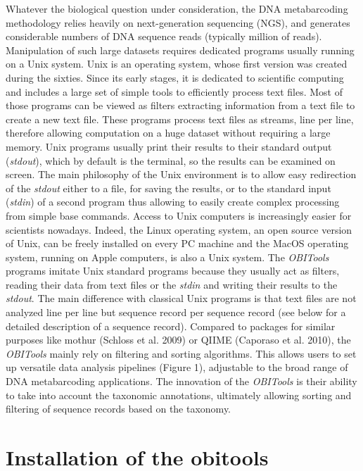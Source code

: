 \documentclass[
  letterpaper,
  DIV=11,
  numbers=noendperiod]{scrreprt}
\begin{document}
Whatever the biological question under consideration, the DNA
metabarcoding methodology relies heavily on next-generation sequencing
(NGS), and generates considerable numbers of DNA sequence reads
(typically million of reads). Manipulation of such large datasets
requires dedicated programs usually running on a Unix system. Unix is an
operating system, whose first version was created during the sixties.
Since its early stages, it is dedicated to scientific computing and
includes a large set of simple tools to efficiently process text files.
Most of those programs can be viewed as filters extracting information
from a text file to create a new text file. These programs process text
files as streams, line per line, therefore allowing computation on a
huge dataset without requiring a large memory. Unix programs usually
print their results to their standard output (\emph{stdout}), which by
default is the terminal, so the results can be examined on screen. The
main philosophy of the Unix environment is to allow easy redirection of
the \emph{stdout} either to a file, for saving the results, or to the
standard input (\emph{stdin}) of a second program thus allowing to
easily create complex processing from simple base commands. Access to
Unix computers is increasingly easier for scientists nowadays. Indeed,
the Linux operating system, an open source version of Unix, can be
freely installed on every PC machine and the MacOS operating system,
running on Apple computers, is also a Unix system. The \emph{OBITools}
programs imitate Unix standard programs because they usually act as
filters, reading their data from text files or the \emph{stdin} and
writing their results to the \emph{stdout}. The main difference with
classical Unix programs is that text files are not analyzed line per
line but sequence record per sequence record (see below for a detailed
description of a sequence record). Compared to packages for similar
purposes like mothur (Schloss et al. 2009) or QIIME (Caporaso et al.
2010), the \emph{OBITools} mainly rely on filtering and sorting
algorithms. This allows users to set up versatile data analysis
pipelines (Figure 1), adjustable to the broad range of DNA metabarcoding
applications. The innovation of the \emph{OBITools} is their ability to
take into account the taxonomic annotations, ultimately allowing sorting
and filtering of sequence records based on the taxonomy.

\hypertarget{installation-of-the-obitools}{%
\chapter{Installation of the
obitools}\label{installation-of-the-obitools}}
\end{document}
